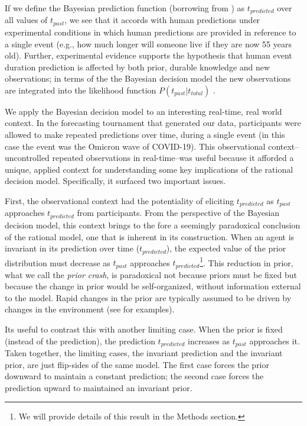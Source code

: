 If we define the Bayesian prediction function (borrowing from \cite{GriffithsTenenbaum2006}) as $t_{predicted}$ over all values of $t_{past}$,  we see that it accords with human predictions under experimental conditions \citep{GriffithsTenenbaum2006} in which human predictions are provided in reference to a single event (e.g., how much longer will someone live if they are now 55 years old).  Further, experimental evidence supports the hypothesis that human event duration prediction is affected by both prior, durable knowledge and new observations; in terms of the the Bayesian decision model the new observations are integrated into the likelihood function $P(t_{past} \vert t_{total})$ \citep{GriffithsTenenbaum2011}.

We apply the Bayesian decision model to an interesting real-time, real world context.  In the forecasting tournament that generated our data, participants were allowed to make repeated predictions over time, during a single event (in this case the event was the Omicron wave of COVID-19).  This observational context--uncontrolled repeated observations in real-time--was useful because it afforded a unique, applied context for understanding some key implications of the rational decision model.  Specifically, it surfaced two important issues. 

First, the observational context had the potentiality of eliciting $t_{predicted}$ as $t_{past}$ approaches $t_{predicted}$ from participants.  From the perspective of the Bayesian decision model, this context brings to the fore a seemingly paradoxical conclusion of the rational model, one that is inherent in its construction.  When an agent is invariant in its prediction over time ($t_{predicted}$), the expected value of the prior distribution must decrease as $t_{past}$ approaches $t_{predicted}$\footnote{We will provide details of this result in the Methods section.}.   This reduction in prior, what we call the \textit{prior crash}, is paradoxical not because priors must be fixed but because the change in prior would be self-organized, without information external to the model.  Rapid changes in the prior are typically assumed to be driven by changes in the environment (see \cite{Sohn2021,Prat2021} for examples).

Its useful to contrast this with another limiting case.  When the prior is fixed (instead of the prediction), the prediction $t_{predicted}$ increases as $t_{past}$ approaches it.  Taken together, the limiting cases, the invariant prediction and the invariant prior, are just flip-sides of the same model. The first case forces the prior downward to maintain a constant prediction; the second case forces the prediction upward to maintained an invariant prior. 

